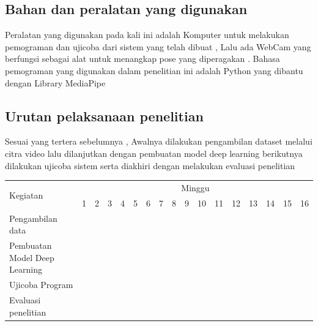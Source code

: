 \subsection{Bahan dan peralatan yang digunakan}

Peralatan yang digunakan pada kali ini adalah Komputer untuk melakukan pemograman dan ujicoba dari sistem yang telah dibuat , Lalu ada WebCam yang berfungsi sebagai alat untuk menangkap pose yang diperagakan . Bahasa pemograman yang digunakan dalam penelitian ini adalah Python yang dibantu dengan Library MediaPipe

\subsection{Urutan pelaksanaan penelitian}
Sesuai yang tertera sebelumnya , Awalnya dilakukan pengambilan dataset melalui citra video lalu dilanjutkan dengan pembuatan model deep learning berikutnya dilakukan ujicoba sistem serta diakhiri dengan melakukan evaluasi penelitian

\newcommand{\w}{}
\newcommand{\G}{\cellcolor{gray}}
\begin{table}[h!]
  \label{tbl:timeline}
  \begin{tabular}{|p{3.5cm}|c|c|c|c|c|c|c|c|c|c|c|c|c|c|c|c|}

    \hline
    \multirow{2}{*}{Kegiatan} & \multicolumn{16}{|c|}{Minggu} \\
    \cline{2-17} &
    1 & 2 & 3 & 4 & 5 & 6 & 7 & 8 & 9 & 10 & 11 & 12 & 13 & 14 & 15 & 16 \\
    \hline

    Pengambilan data &
    \G & \G & \G & \G & \w & \w & \w & \w & \w & \w & \w & \w & \w & \w & \w & \w \\
    \hline

    Pembuatan Model Deep Learning &
    \w & \w & \w & \w & \G & \G & \G & \G & \w & \w & \w & \w & \w & \w & \w & \w \\
    \hline

    Ujicoba Program &
    \w & \w & \w & \w & \w & \w & \w & \w & \G & \G & \G & \G & \w & \w & \w & \w \\
    \hline

    Evaluasi penelitian &
    \w & \w & \w & \w & \w & \w & \w & \w & \w & \w & \w & \w & \G & \G & \G & \G \\
    \hline

  \end{tabular}
\end{table}